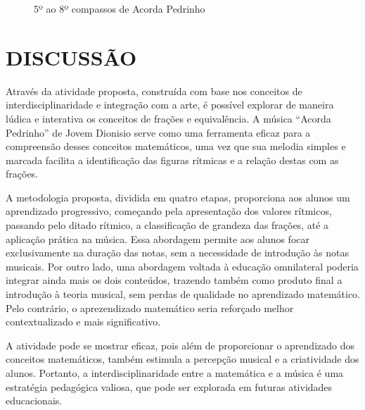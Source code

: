 \documentclass[
  letterpaper,
  DIV=11,
  numbers=noendperiod]{scrreprt}
\begin{document}
\begin{figure}


\caption{\label{fig-compassos}5º ao 8º compassos de Acorda Pedrinho}

\end{figure}%

\chapter{DISCUSSÃO}\label{discussuxe3o}

Através da atividade proposta, construída com base nos conceitos de
interdisciplinaridade e integração com a arte, é possível explorar de
maneira lúdica e interativa os conceitos de frações e equivalência. A
música ``Acorda Pedrinho'' de Jovem Dionisio serve como uma ferramenta
eficaz para a compreensão desses conceitos matemáticos, uma vez que sua
melodia simples e marcada facilita a identificação das figuras rítmicas
e a relação destas com as frações.

A metodologia proposta, dividida em quatro etapas, proporciona aos
alunos um aprendizado progressivo, começando pela apresentação dos
valores rítmicos, passando pelo ditado rítmico, a classificação de
grandeza das frações, até a aplicação prática na música. Essa abordagem
permite aos alunos focar exclusivamente na duração das notas, sem a
necessidade de introdução às notas musicais. Por outro lado, uma
abordagem voltada à educação omnilateral poderia integrar ainda mais os
dois conteúdos, trazendo também como produto final a introdução à teoria
musical, sem perdas de qualidade no aprendizado matemático. Pelo
contrário, o aprezendizado matemático seria reforçado melhor
contextualizado e mais significativo.

A atividade pode se mostrar eficaz, pois além de proporcionar o
aprendizado dos conceitos matemáticos, também estimula a percepção
musical e a criatividade dos alunos. Portanto, a interdisciplinaridade
entre a matemática e a música é uma estratégia pedagógica valiosa, que
pode ser explorada em futuras atividades educacionais.
\end{document}
